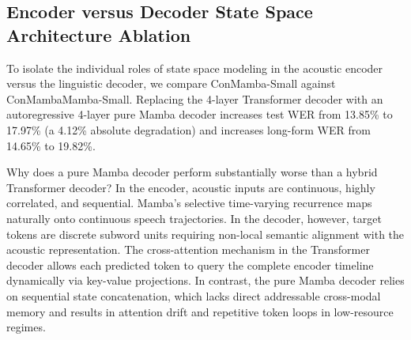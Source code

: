 \documentclass[journal]{IEEEtran}
\begin{document}
\subsection{Encoder versus Decoder State Space Architecture Ablation}
\label{sec:ssm_ablation}
To isolate the individual roles of state space modeling in the acoustic encoder versus the linguistic decoder, we compare ConMamba-Small against ConMambaMamba-Small. Replacing the 4-layer Transformer decoder with an autoregressive 4-layer pure Mamba decoder increases test WER from 13.85\% to 17.97\% (a 4.12\% absolute degradation) and increases long-form WER from 14.65\% to 19.82\%.

Why does a pure Mamba decoder perform substantially worse than a hybrid Transformer decoder? In the encoder, acoustic inputs are continuous, highly correlated, and sequential. Mamba's selective time-varying recurrence maps naturally onto continuous speech trajectories. In the decoder, however, target tokens are discrete subword units requiring non-local semantic alignment with the acoustic representation. The cross-attention mechanism in the Transformer decoder allows each predicted token to query the complete encoder timeline dynamically via key-value projections. In contrast, the pure Mamba decoder relies on sequential state concatenation, which lacks direct addressable cross-modal memory and results in attention drift and repetitive token loops in low-resource regimes.
\end{document}
